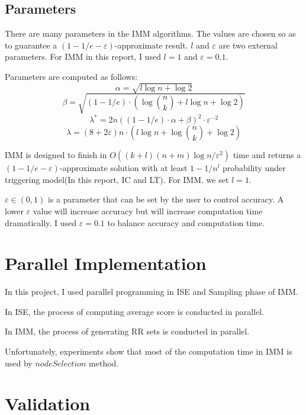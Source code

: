 \documentclass[conference]{IEEEtran}
\begin{document}
\subsection{Parameters}
There are many parameters in the IMM algorithms. The values are chosen so as to guarantee a $(1-1/e-\varepsilon)$-approximate result. $l$ and $\varepsilon$ are two external parameters. For IMM in this report, I used $l = 1$ and $\varepsilon = 0.1$.

Parameters are computed as follows:
\begin{equation}
\alpha = \sqrt{l \log n+\log 2} 
\end{equation}
\begin{equation}
\beta = \sqrt{(1-1/e)\cdot (\log {n\choose k}+l\log n + \log 2)}
\end{equation}
\begin{equation}
\lambda^* = 2n((1-1/e)\cdot \alpha + \beta)^2\cdot\varepsilon^{-2}
\end{equation}    
\begin{equation}
\lambda = (8+2\varepsilon)n\cdot(l\log n+\log{n\choose k}+\log2)
\end{equation}

IMM is designed to finish in $O((k+l)(n+m)\log n/\varepsilon^2)$ time and returns a $(1-1/e-\varepsilon)$-approximate solution with at least $1-1/n^l$ probability under triggering model(In this report, IC and LT)\cite{Kempe:2003:MSI:956750.956769}. For IMM, we set $l = 1$.

$\varepsilon \in (0,1)$ is a parameter that can be set by the user to control accuracy. A lower $\varepsilon$ value will increase accuracy but will increase computation time dramatically. I used $\varepsilon = 0.1 $ to balance accuracy and computation time.

\section {Parallel Implementation}
In this project, I used parallel programming in ISE and Sampling phase of IMM.

In ISE, the process of computing average score is conducted in parallel.

In IMM, the process of generating RR sets is conducted in parallel.

Unfortunately, experiments show that most of the computation time in IMM is used by $nodeSelection$ method.

\section{Validation}
\end{document}
